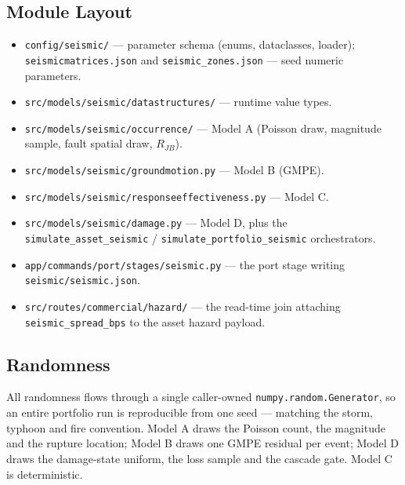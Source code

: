\documentclass[11pt,a4paper]{article}
\begin{document}
\mkmimplementation

\subsection{Module Layout}
\begin{itemize}
  \item \texttt{config/seismic/} --- parameter schema (enums, dataclasses,
        loader); \texttt{seismicmatrices.json} and \texttt{seismic\_zones.json}
        --- seed numeric parameters.
  \item \texttt{src/models/seismic/datastructures/} --- runtime value types.
  \item \texttt{src/models/seismic/occurrence/} --- Model A (Poisson draw,
        magnitude sample, fault spatial draw, $R_{JB}$).
  \item \texttt{src/models/seismic/groundmotion.py} --- Model B (GMPE).
  \item \texttt{src/models/seismic/responseeffectiveness.py} --- Model C.
  \item \texttt{src/models/seismic/damage.py} --- Model D, plus the
        \texttt{simulate\_asset\_seismic} / \texttt{simulate\_portfolio\_seismic}
        orchestrators.
  \item \texttt{app/commands/port/stages/seismic.py} --- the port stage writing
        \texttt{seismic/seismic.json}.
  \item \texttt{src/routes/commercial/hazard/} --- the read-time join attaching
        \texttt{seismic\_spread\_bps} to the asset hazard payload.
\end{itemize}

\subsection{Randomness}
All randomness flows through a single caller-owned
\texttt{numpy.random.Generator}, so an entire portfolio run is reproducible from
one seed --- matching the storm, typhoon and fire convention. Model A draws the
Poisson count, the magnitude and the rupture location; Model B draws one GMPE
residual per event; Model D draws the damage-state uniform, the loss sample and
the cascade gate. Model C is deterministic.

\mkmvalidation
\end{document}
